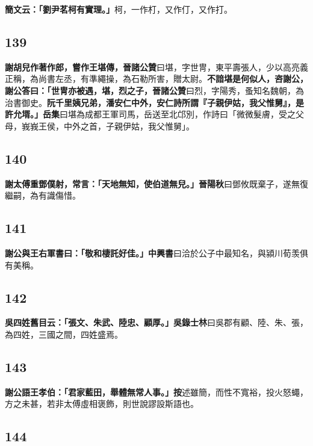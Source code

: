 \textbf{簡文云：「劉尹茗柯有實理。」}{\footnotesize 柯，一作朾，又作仃，又作打。}

\subsection*{139}

\textbf{謝胡兒作著作郎，嘗作王堪傳，}{\footnotesize \textbf{晉諸公贊}曰堪，字世冑，東平壽張人，少以高亮義正稱，為尚書左丞，有準繩操，為石勒所害，贈太尉。}\textbf{不諳堪是何似人，咨謝公，謝公答曰：「世冑亦被遇，堪，烈之子，}{\footnotesize \textbf{晉諸公贊}曰烈，字陽秀，蚤知名魏朝，為治書御史。}\textbf{阮千里姨兄弟，潘安仁中外，安仁詩所謂『子親伊姑，我父惟舅』，是許允壻。」}{\footnotesize \textbf{岳集}曰堪為成都王軍司馬，岳送至北邙別，作詩曰「微微髮膚，受之父母，峩峩王侯，中外之首，子親伊姑，我父惟舅」。}

\subsection*{140}

\textbf{謝太傅重鄧僕射，常言：「天地無知，使伯道無兒。」}{\footnotesize \textbf{晉陽秋}曰鄧攸既棄子，遂無復繼嗣，為有識傷惜。}

\subsection*{141}

\textbf{謝公與王右軍書曰：「敬和棲託好佳。」}{\footnotesize \textbf{中興書}曰洽於公子中最知名，與潁川荀羡俱有美稱。}

\subsection*{142}

\textbf{吳四姓舊目云：「張文、朱武、陸忠、顧厚。」}{\footnotesize \textbf{吳錄士林}曰吳郡有顧、陸、朱、張，為四姓，三國之間，四姓盛焉。}

\subsection*{143}

\textbf{謝公語王孝伯：「君家藍田，舉體無常人事。」}{\footnotesize \textbf{按}述雖簡，而性不寬裕，投火怒蠅，方之未甚，若非太傅虛相褒飾，則世說謬設斯語也。}

\subsection*{144}

